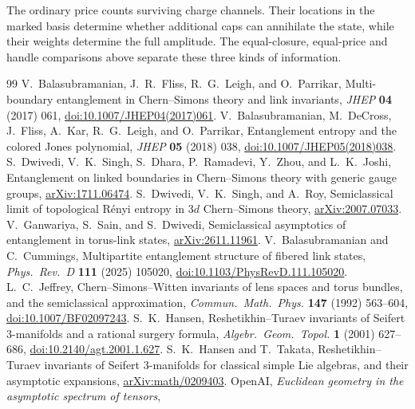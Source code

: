 \documentclass[11pt]{article}
\theoremstyle{remark}
\begin{document}
The ordinary price counts surviving charge channels. Their locations in the marked basis determine whether additional caps can annihilate the state, while their weights determine the full amplitude. The equal-closure, equal-price and handle comparisons above separate these three kinds of information.
\clearpage
\begin{thebibliography}{99}
V.~Balasubramanian, J.~R.~Fliss, R.~G.~Leigh, and O.~Parrikar,
Multi-boundary entanglement in Chern--Simons theory and link invariants,
\emph{JHEP} \textbf{04} (2017) 061,
\href{https://doi.org/10.1007/JHEP04(2017)061}{doi:10.1007/JHEP04(2017)061}.
V.~Balasubramanian, M.~DeCross, J.~Fliss, A.~Kar, R.~G.~Leigh, and O.~Parrikar,
Entanglement entropy and the colored Jones polynomial,
\emph{JHEP} \textbf{05} (2018) 038,
\href{https://doi.org/10.1007/JHEP05(2018)038}{doi:10.1007/JHEP05(2018)038}.
S.~Dwivedi, V.~K.~Singh, S.~Dhara, P.~Ramadevi, Y.~Zhou, and L.~K.~Joshi,
Entanglement on linked boundaries in Chern--Simons theory with generic gauge groups,
\href{https://arxiv.org/abs/1711.06474}{arXiv:1711.06474}.
S.~Dwivedi, V.~K.~Singh, and A.~Roy,
Semiclassical limit of topological R\'enyi entropy in \(3d\) Chern--Simons theory,
\href{https://arxiv.org/abs/2007.07033}{arXiv:2007.07033}.
V.~Ganwariya, S.~Sain, and S.~Dwivedi,
Semiclassical asymptotics of entanglement in torus-link states,
\href{https://arxiv.org/abs/2611.11961}{arXiv:2611.11961}.
V.~Balasubramanian and C.~Cummings, Multipartite entanglement structure of fibered link states,
\emph{Phys.\ Rev.\ D} \textbf{111} (2025) 105020,
\href{https://doi.org/10.1103/PhysRevD.111.105020}{doi:10.1103/PhysRevD.111.105020}.
L.~C.~Jeffrey, Chern--Simons--Witten invariants of lens spaces and torus bundles, and the semiclassical approximation,
\emph{Commun.\ Math.\ Phys.} \textbf{147} (1992) 563--604,
\href{https://doi.org/10.1007/BF02097243}{doi:10.1007/BF02097243}.
S.~K.~Hansen, Reshetikhin--Turaev invariants of Seifert \(3\)-manifolds and a rational surgery formula,
\emph{Algebr.\ Geom.\ Topol.} \textbf{1} (2001) 627--686,
\href{https://doi.org/10.2140/agt.2001.1.627}{doi:10.2140/agt.2001.1.627}.
S.~K.~Hansen and T.~Takata, Reshetikhin--Turaev invariants of Seifert \(3\)-manifolds for classical simple Lie algebras, and their asymptotic expansions,
\href{https://arxiv.org/abs/math/0209403}{arXiv:math/0209403}.
OpenAI, \emph{Euclidean geometry in the asymptotic spectrum of tensors},

\end{thebibliography}
\end{document}
